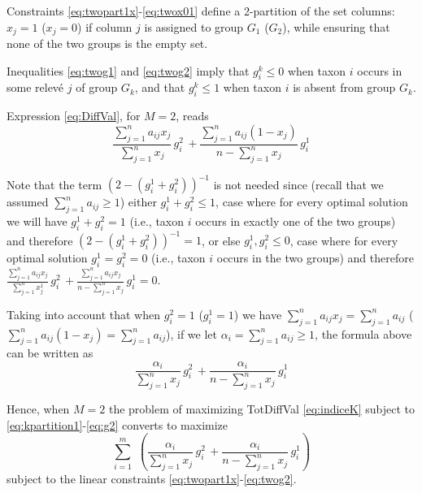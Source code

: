 Constraints \eqref{eq:twopart1x}-\eqref{eq:twox01} define a 2-partition of the set columns: \(x_j=1\) (\(x_j=0\)) if column \(j\) is assigned to group \(G_1\) (\(G_2\)), while ensuring that none of the two groups is the empty set.

Inequalities \eqref{eq:twog1} and \eqref{eq:twog2} imply that \(g_i^k\leq 0\) when taxon \(i\) occurs in some relevé \(j\) of group \(G_k\), and that \(g_i^k\leq 1\) when taxon \(i\) is absent from group \(G_k\).

Expression \eqref{eq:DiffVal}, for \(M=2\), reads
\begin{equation*}
\displaystyle{
\frac{\sum_{j=1}^n a_{ij} x_j}{\sum_{j=1}^n x_j} \, g_i^2 
\,+
\frac{\sum_{j=1}^n a_{ij} (1-x_j)}{n-\sum_{j=1}^n x_j} \, g_i^1 
}
\end{equation*}

Note that the term \((2-(g_i^1+g_i^2))^{-1}\) is not needed since (recall that we assumed \(\sum_{j=1}^n a_{ij} \geq 1\)) either \(g_i^1+g_i^2\leq 1\), case where for every optimal solution we will have \(g_i^1+g_i^2=1\) (i.e., taxon \(i\) occurs in exactly one of the two groups) and therefore \((2-(g_i^1+g_i^2))^{-1}=1\), or else \(g_i^1, g_i^2\leq 0\), case where for every optimal solution \(g_i^1=g_i^2= 0\) (i.e., taxon \(i\) occurs in the two groups) and therefore\(\frac{\sum_{j=1}^n a_{ij} x_j}{\sum_{j=1}^n x_j^1} \, g_i^2 \,+ \frac{\sum_{j=1}^n a_{ij} x_j}{n-\sum_{j=1}^n x_j} \, g_i^1 =0\).

Taking into account that when \(g_i^2=1\) (\(g_i^1=1\)) we have \(\sum_{j=1}^n a_{ij} x_j= \sum_{j=1}^n a_{ij}\) (\(\sum_{j=1}^n a_{ij} (1-x_j)= \sum_{j=1}^n a_{ij}\)), if we let \(\alpha_i=\sum_{j=1}^n a_{ij} \geq 1\), the formula above can be written as
\begin{equation*}
\displaystyle{
\frac{\alpha_{i}}{\sum_{j=1}^n x_j} \, g_i^2 
\,+
\frac{\alpha_{i}}{n-\sum_{j=1}^n x_j} \, g_i^1 
}
\label{eq:DiffVal2}
\end{equation*}

Hence, when \(M=2\) the problem of maximizing TotDiffVal \eqref{eq:indiceK} subject to \eqref{eq:kpartition1}-\eqref{eq:g2} converts to maximize
\begin{equation}
\displaystyle{
\displaystyle{\sum_{i=1}^m}\,\,
\left(\frac{\alpha_{i}}{\sum_{j=1}^n x_j} \, g_i^2
\,+
\frac{\alpha_{i}}{n-\sum_{j=1}^n x_j} \, g_i^1 \right)
}
\label{eq:TotDiffVal2}
\end{equation}
subject to the linear constraints \eqref{eq:twopart1x}-\eqref{eq:twog2}.

